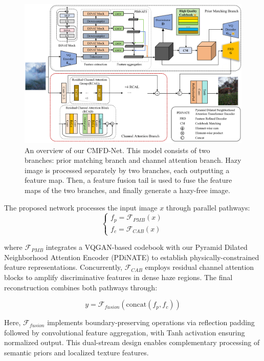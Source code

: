 \documentclass[journal]{IEEEtran}
\begin{document}
\begin{figure}[!t]
	\centering
	\includegraphics[width=7in]{images/network_architecture}
	\caption{An overview of our CMFD-Net. This model consists of two branches: prior matching branch and channel attention branch. Hazy image is processed separately by two branches, each outputting a feature map. Then, a feature fusion tail is used to fuse the feature maps of the two branches, and finally generate a hazy-free image.}
	\label{fig0}
\end{figure}

The proposed network processes the input image $x$ through parallel pathways:
\begin{equation}
	\begin{cases}
		f_p = \mathcal{F}_{PMB}(x) \\
		f_c = \mathcal{F}_{CAB}(x)
	\end{cases}
\end{equation}

\noindent where $\mathcal{F}_{PMB}$ integrates a VQGAN-based codebook with our Pyramid Dilated Neighborhood Attention Encoder (PDiNATE) to establish physically-constrained feature representations. Concurrently, $\mathcal{F}_{CAB}$ employs residual channel attention blocks to amplify discriminative features in dense haze regions. The final reconstruction combines both pathways through:

\begin{equation}
	y = \mathcal{F}_{fusion}(\text{concat}(f_p, f_c))
\end{equation}

\noindent Here, $\mathcal{F}_{fusion}$ implements boundary-preserving operations via reflection padding followed by convolutional feature aggregation, with Tanh activation ensuring normalized output. This dual-stream design enables complementary processing of semantic priors and localized texture features.
\end{document}
